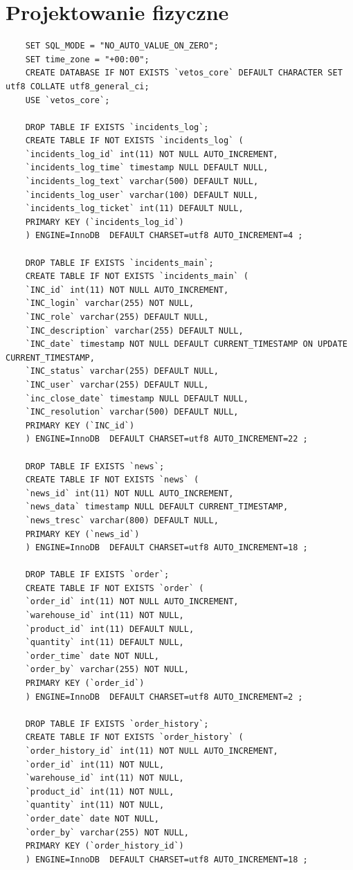 \documentclass[10pt,a4paper]{article}
\begin{document}
\section{Projektowanie fizyczne}
	\begin{lstlisting}
	SET SQL_MODE = "NO_AUTO_VALUE_ON_ZERO";
	SET time_zone = "+00:00";
	CREATE DATABASE IF NOT EXISTS `vetos_core` DEFAULT CHARACTER SET utf8 COLLATE utf8_general_ci;
	USE `vetos_core`;
	
	DROP TABLE IF EXISTS `incidents_log`;
	CREATE TABLE IF NOT EXISTS `incidents_log` (
	`incidents_log_id` int(11) NOT NULL AUTO_INCREMENT,
	`incidents_log_time` timestamp NULL DEFAULT NULL,
	`incidents_log_text` varchar(500) DEFAULT NULL,
	`incidents_log_user` varchar(100) DEFAULT NULL,
	`incidents_log_ticket` int(11) DEFAULT NULL,
	PRIMARY KEY (`incidents_log_id`)
	) ENGINE=InnoDB  DEFAULT CHARSET=utf8 AUTO_INCREMENT=4 ;
	
	DROP TABLE IF EXISTS `incidents_main`;
	CREATE TABLE IF NOT EXISTS `incidents_main` (
	`INC_id` int(11) NOT NULL AUTO_INCREMENT,
	`INC_login` varchar(255) NOT NULL,
	`INC_role` varchar(255) DEFAULT NULL,
	`INC_description` varchar(255) DEFAULT NULL,
	`INC_date` timestamp NOT NULL DEFAULT CURRENT_TIMESTAMP ON UPDATE CURRENT_TIMESTAMP,
	`INC_status` varchar(255) DEFAULT NULL,
	`INC_user` varchar(255) DEFAULT NULL,
	`inc_close_date` timestamp NULL DEFAULT NULL,
	`INC_resolution` varchar(500) DEFAULT NULL,
	PRIMARY KEY (`INC_id`)
	) ENGINE=InnoDB  DEFAULT CHARSET=utf8 AUTO_INCREMENT=22 ;
	
	DROP TABLE IF EXISTS `news`;
	CREATE TABLE IF NOT EXISTS `news` (
	`news_id` int(11) NOT NULL AUTO_INCREMENT,
	`news_data` timestamp NULL DEFAULT CURRENT_TIMESTAMP,
	`news_tresc` varchar(800) DEFAULT NULL,
	PRIMARY KEY (`news_id`)
	) ENGINE=InnoDB  DEFAULT CHARSET=utf8 AUTO_INCREMENT=18 ;
	
	DROP TABLE IF EXISTS `order`;
	CREATE TABLE IF NOT EXISTS `order` (
	`order_id` int(11) NOT NULL AUTO_INCREMENT,
	`warehouse_id` int(11) NOT NULL,
	`product_id` int(11) DEFAULT NULL,
	`quantity` int(11) DEFAULT NULL,
	`order_time` date NOT NULL,
	`order_by` varchar(255) NOT NULL,
	PRIMARY KEY (`order_id`)
	) ENGINE=InnoDB  DEFAULT CHARSET=utf8 AUTO_INCREMENT=2 ;
	
	DROP TABLE IF EXISTS `order_history`;
	CREATE TABLE IF NOT EXISTS `order_history` (
	`order_history_id` int(11) NOT NULL AUTO_INCREMENT,
	`order_id` int(11) NOT NULL,
	`warehouse_id` int(11) NOT NULL,
	`product_id` int(11) NOT NULL,
	`quantity` int(11) NOT NULL,
	`order_date` date NOT NULL,
	`order_by` varchar(255) NOT NULL,
	PRIMARY KEY (`order_history_id`)
	) ENGINE=InnoDB  DEFAULT CHARSET=utf8 AUTO_INCREMENT=18 ;
	

\end{lstlisting}
\end{document}
